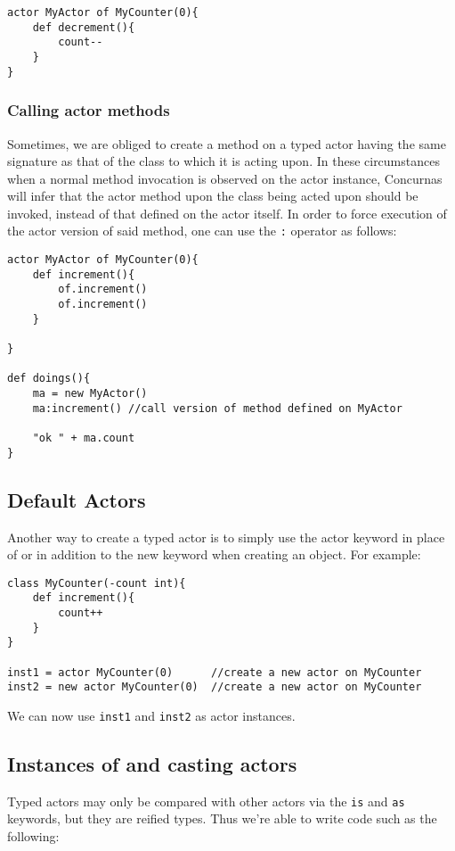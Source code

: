 \documentclass[conc-doc]{subfiles}
\begin{document}
\begin{lstlisting}
actor MyActor of MyCounter(0){
	def decrement(){
		count--
	}
}
\end{lstlisting}

\subsubsection{Calling actor methods}
Sometimes, we are obliged to create a method on a typed actor having the same signature as that of the class to which it is acting upon. In these circumstances when a normal method invocation is observed on the actor instance, Concurnas will infer that the actor method upon the class being acted upon should be invoked, instead of that defined on the actor itself. In order to force execution of the actor version of said method, one can use the \lstinline{:} operator as follows:

\begin{lstlisting}
actor MyActor of MyCounter(0){
	def increment(){
		of.increment()
		of.increment()
	}
	
}

def doings(){
	ma = new MyActor()
	ma:increment() //call version of method defined on MyActor
	
	"ok " + ma.count
}
\end{lstlisting}


\subsection{Default Actors}
Another way to create a typed actor is to simply use the actor keyword in place of or in addition to the new keyword when creating an object. For example:

\begin{lstlisting}
class MyCounter(-count int){
	def increment(){
		count++
	}
}

inst1 = actor MyCounter(0)      //create a new actor on MyCounter
inst2 = new actor MyCounter(0)  //create a new actor on MyCounter
\end{lstlisting}

We can now use \lstinline{inst1} and \lstinline{inst2} as actor instances.

\subsection{Instances of and casting actors}
Typed actors may only be compared with other actors via the \lstinline{is} and \lstinline{as} keywords, but they are reified types. Thus we're able to write code such as the following:
\end{document}
